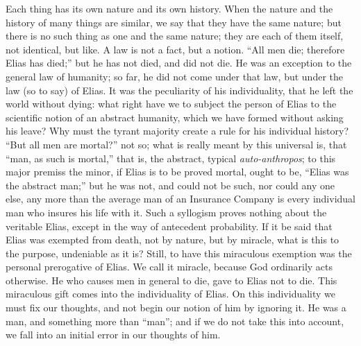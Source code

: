 Each thing has its own nature and its own history. When the nature
and the history of many things are similar, we say that they have the
same nature; but there is no such thing as one and the same nature;
they are each of them itself, not identical, but like. A law is not a
fact, but a notion. ``All men die; therefore Elias has died;''
but he has not died, and did not die. He was an exception to the
general law of humanity; so far, he did not come under that law, but
under the law (so to say) of Elias. It was the peculiarity of
his individuality, that he left the world without dying: what right
have we to subject the person of Elias to the scientific notion of an
abstract humanity, which we have formed without asking his leave? Why
must the tyrant majority create a rule for his individual history?
``But all men are mortal?'' not so; what is really meant by
this universal is, that ``man, as such is mortal,'' that is,
the abstract, typical \emph{auto-anthropos}; to this major premiss the
minor, if Elias is to be proved mortal, ought to be, ``Elias was
the abstract man;'' but he was not, and could not be such, nor
could any one else, any more than the average man of an Insurance
Company is every individual man who insures his life with it. Such a
syllogism proves nothing about the veritable Elias, except in the way
of antecedent probability. If it be said that Elias was exempted from
death, not by nature, but by miracle, what is this to the purpose,
undeniable as it is? Still, to have this miraculous exemption was the
personal prerogative of Elias. We call it miracle, because God
ordinarily acts otherwise. He who causes men in general to die, gave
to Elias not to die. This miraculous gift comes into the individuality
of Elias. On this individuality we must fix our thoughts, and not
begin our notion of him by ignoring it. He was a man, and something
more than ``man''; and if we do not take this into account, we
fall into an initial error in our thoughts of him.

